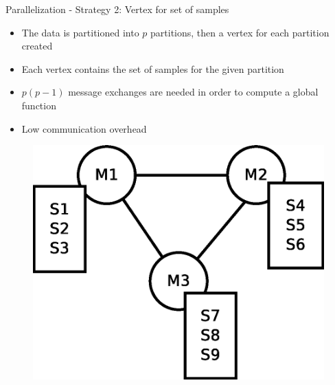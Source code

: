 \documentclass{beamer}
\begin{document}
\begin{frame}{Parallelization - Strategy 2: Vertex for set of samples}

\begin{itemize}
\item The data is partitioned into $p$ partitions, then a vertex for each partition  created
\item Each vertex contains the set of samples for the given partition
\item $p(p-1)$ message exchanges are needed in order to compute a global function
\item Low communication overhead
\end{itemize}

\begin{figure}[!htb]
  \centering
  \includegraphics[scale=0.30]{graph2.eps}
  \label{fig:vss:graph2}
\end{figure}

\end{frame}

\end{document}
